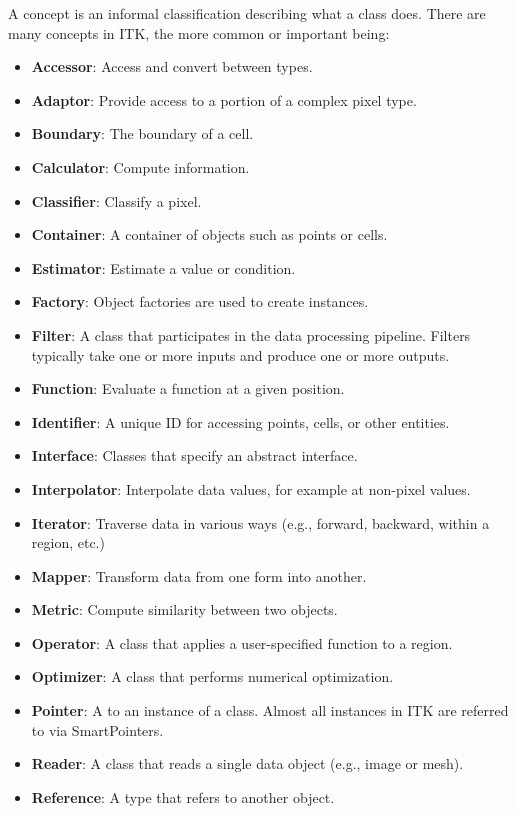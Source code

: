 A concept is an informal classification describing what a class does. There are
many concepts in ITK, the more common or important being:
\begin{itemize}
\item \textbf{Accessor}: Access and convert between types.
\item \textbf{Adaptor}: Provide access to a portion of a complex pixel type.
\item \textbf{Boundary}: The boundary of a cell.
\item \textbf{Calculator}: Compute information.
\item \textbf{Classifier}: Classify a pixel.
\item \textbf{Container}: A container of objects such as points or cells.
\item \textbf{Estimator}: Estimate a value or condition.
\item \textbf{Factory}: Object factories are used to create instances.
\item \textbf{Filter}: A class that participates in the data processing
pipeline. Filters typically take one or more inputs and produce one or more
outputs.
\item \textbf{Function}: Evaluate a function at a given position.
\item \textbf{Identifier}: A unique ID for accessing points, cells, or other
entities.
\item \textbf{Interface}: Classes that specify an abstract interface.
\item \textbf{Interpolator}: Interpolate data values, for example at non-pixel
values.
\item \textbf{Iterator}: Traverse data in various ways (e.g., forward, backward,
within a region, etc.)
\item \textbf{Mapper}: Transform data from one form into another.
\item \textbf{Metric}: Compute similarity between two objects.
\item \textbf{Operator}: A class that applies a user-specified function to a
region.
\item \textbf{Optimizer}: A class that performs numerical optimization.
\item \textbf{Pointer}: A  to an instance of a class.
Almost all instances in ITK are referred to via SmartPointers.
\item \textbf{Reader}: A class that reads a single data object (e.g., image or
mesh).
\item \textbf{Reference}: A type that refers to another object.

\end{itemize}
